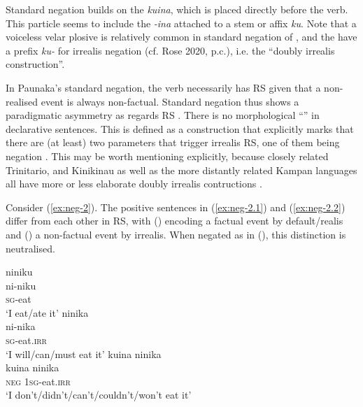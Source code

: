 Standard negation builds on the  \textit{kuina}, which is placed directly before the verb. This particle seems to include the  \textit{-ina} attached to a stem or affix \textit{ku}. Note that a voiceless velar plosive is relatively common in standard negation of  \citep[288]{Michael2014b}, and the  have a prefix \textit{ku-} for irrealis negation (cf. Rose 2020, p.c.), i.e. the “doubly irrealis construction”.

In Paunaka’s standard negation, the verb necessarily has  RS given that a non-realised event is always non-factual. Standard negation thus shows a paradigmatic asymmetry as regards RS \citep[96]{Miestamo2005}. There is no morphological “” in declarative sentences. This is defined as a construction that explicitly marks that there are (at least) two parameters that trigger irrealis RS, one of them being negation \citep[cf.][253]{Michael2014}. This may be worth mentioning explicitly, because closely related Trinitario,  and Kinikinau as well as the more distantly related Kampan languages all have more or less elaborate doubly irrealis contructions \citep[267--269]{Michael2014b}.%

Consider (\ref{ex:neg-2}). The positive sentences in (\ref{ex:neg-2.1}) and (\ref{ex:neg-2.2}) differ from each other in RS, with () encoding a factual event by default/realis and () a non-factual event by irrealis. When negated as in (), this distinction is neutralised.


\ea\label{ex:neg-2}
  \ea\label{ex:neg-2.1}
\begingl
\glpreamble niniku\\
\gla ni-niku\\
\textsc{sg}-eat\\
\glft ‘I eat/ate it’
\endgl
  \ex\label{ex:neg-2.2}
\begingl
\glpreamble ninika\\
\gla ni-nika\\
\textsc{sg}-eat.\textsc{irr}\\
\glft ‘I will/can/must eat it’
\endgl
  \ex\label{ex:neg-2.3}
\begingl
\glpreamble kuina ninika\\
\gla kuina ninika\\
\glb \textsc{neg} 1\textsc{sg}-eat.\textsc{irr}\\
\glft ‘I don’t/didn’t/can’t/couldn’t/won’t eat it’
\endgl
\z
\xe

